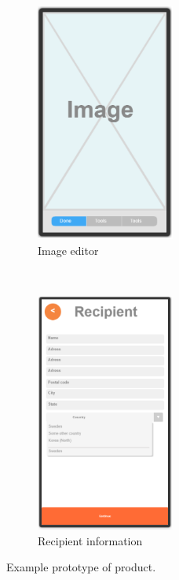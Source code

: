 \documentclass[10pt,a4paper]{article}
\begin{document}
\begin{figure}[p]
\begin{subfigure}{0.5\textwidth}
		\label{fig:p2}
	\end{subfigure}\\[0.5cm]
	\begin{subfigure}{0.5\textwidth}
		\centering
		\includegraphics[width=0.5\textwidth]{Prototype_img/p3.png}
		\caption{Image editor}
		\label{fig:p3}
	\end{subfigure}~
	\begin{subfigure}{0.5\textwidth}
		\centering
		\includegraphics[width=0.5\textwidth]{Prototype_img/p4.png}
		\caption{Recipient information}
		\label{fig:p4}
	\end{subfigure}
	\caption{Example prototype of product.}
	\label{fig:prot}
\end{figure}
\FloatBarrier
\end{document}
